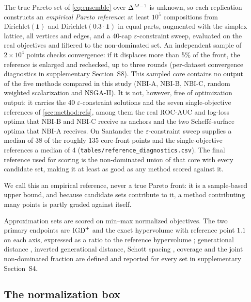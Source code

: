 The true Pareto set of \cref{eq:ensemble} over $\Delta^{M-1}$ is unknown, so each replication constructs an
\emph{empirical Pareto reference}: at least $10^{5}$ compositions
from $\mathrm{Dirichlet}(\mathbf{1})$ and $\mathrm{Dirichlet}(0.3\cdot\mathbf{1})$ in equal parts, augmented with the
simplex lattice, all vertices and edges, and a 40-cap $\varepsilon$-constraint sweep, evaluated on the real objectives
and filtered to the non-dominated set. An independent sample of $2\times10^{4}$ points checks convergence: if it
displaces more than 5\% of the front, the reference is enlarged and rechecked, up to three rounds (per-dataset
convergence diagnostics in supplementary Section~S8). This sampled core
contains no output of the five methods compared in this study (NBI-A, NBI-B, NBI-C, random weighted scalarization
and NSGA-II). It is not, however, free of optimization output: it carries the 40 $\varepsilon$-constraint solutions and
the seven single-objective references of \cref{sec:method:refs}, among them the real ROC-AUC and log-loss optima that
NBI-B and NBI-C receive as anchors and the two Scheff\'e-surface optima that NBI-A receives. On Santander the
$\varepsilon$-constraint sweep supplies a median of 38 of the roughly 135 core-front points and the single-objective
references a median of 4 (\texttt{tables/reference\_diagnostics.csv}). The final reference used for scoring is the non-dominated union of that core with every candidate set, making it
at least as good as any method scored against it.

We call this an empirical reference, never a true Pareto front: it is a sample-based upper bound, and because
candidate sets contribute to it, a method contributing many points is partly graded against itself.

Approximation sets are scored on min--max normalized objectives. The two primary endpoints are $\mathrm{IGD}^{+}$
\citep{ishibuchi2015modified} and the exact hypervolume with reference point $1.1$ on each axis, expressed as a ratio
to the reference hypervolume \citep{zitzler1999multiobjective}; generational distance
\citep{vanveldhuizen2000multiobjective}, inverted generational distance, Schott spacing \citep{schott1995fault},
coverage and the joint non-dominated fraction \citep{zitzler2003performance} are defined and reported for every set
in supplementary Section~S4.

\subsection{The normalization box}
\label{sec:method:normbox}

